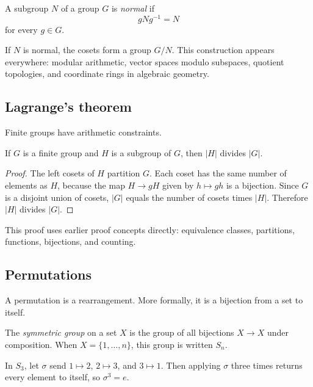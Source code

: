 \begin{definition}
A subgroup $N$ of a group $G$ is \emph{normal} if
\[
gNg^{-1}=N
\]
for every $g\in G$.
\end{definition}

If $N$ is normal, the cosets form a group $G/N$. This construction appears
everywhere: modular arithmetic, vector spaces modulo subspaces, quotient
topologies, and coordinate rings in algebraic geometry.

\subsection{Lagrange's theorem}

Finite groups have arithmetic constraints.

\begin{theorem}
If $G$ is a finite group and $H$ is a subgroup of $G$, then $|H|$ divides
$|G|$.
\end{theorem}

\begin{proof}
The left cosets of $H$ partition $G$. Each coset has the same number of elements
as $H$, because the map $H\to gH$ given by $h\mapsto gh$ is a bijection. Since
$G$ is a disjoint union of cosets, $|G|$ equals the number of cosets times
$|H|$. Therefore $|H|$ divides $|G|$.
\end{proof}

This proof uses earlier proof concepts directly: equivalence classes, partitions,
functions, bijections, and counting.

\subsection{Permutations}

A permutation is a rearrangement. More formally, it is a bijection from a set to
itself.

\begin{definition}
The \emph{symmetric group} on a set $X$ is the group of all bijections
$X\to X$ under composition. When $X=\{1,\ldots,n\}$, this group is written
$S_n$.
\end{definition}

\begin{example}
In $S_3$, let $\sigma$ send $1\mapsto 2$, $2\mapsto 3$, and $3\mapsto 1$.
Then applying $\sigma$ three times returns every element to itself, so
$\sigma^3=e$.
\end{example}

